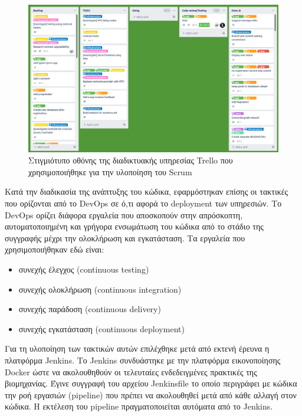 \begin{figure}[H]
    \centering
    \includegraphics[width=.8\textwidth]{assets/figures/chapter-4/4.2.implementation-methodology-kanban.png}
    \caption{Στιγμιότυπο οθόνης της διαδικτυακής υπηρεσίας Trello που χρησιμοποιήθηκε για την υλοποίηση του Scrum}
    \label{figure:4.2.implementation-methodology-kanban}
\end{figure}

Κατά την διαδικασία της ανάπτυξης του κώδικα, εφαρμόστηκαν επίσης οι τακτικές που ορίζονται από το DevOps σε ό,τι αφορά το deployment των υπηρεσιών. Το DevOps ορίζει διάφορα εργαλεία που αποσκοπούν στην απρόσκοπτη, αυτοματοποιημένη και γρήγορα ενσωμάτωση του κώδικα από το στάδιο της συγγραφής μέχρι την ολοκλήρωση και εγκατάσταση. Τα εργαλεία που χρησιμοποιήθηκαν εδώ είναι:

\begin{itemize}
    \item συνεχής έλεγχος (continuous testing)
    \item συνεχής ολοκλήρωση (continuous integration)
    \item συνεχής παράδοση (continuous delivery)
    \item συνεχής εγκατάσταση (continuous deployment)
\end{itemize}

Για τη υλοποίηση των τακτικών αυτών επιλέχθηκε μετά από εκτενή έρευνα η πλατφόρμα Jenkins. Το Jenkins συνδυάστηκε με την πλατφόρμα εικονοποίησης Docker ώστε να ακολουθηθούν οι τελευταίες ενδεδειγμένες πρακτικές της βιομηχανίας. Έγινε συγγραφή του αρχείου Jenkinsfile το οποίο περιγράφει με κώδικα την ροή εργασιών (pipeline) που πρέπει να ακολουθηθεί μετά από κάθε αλλαγή στον κώδικα. Η εκτέλεση του pipeline πραγματοποιείται αυτόματα από το Jenkins.


